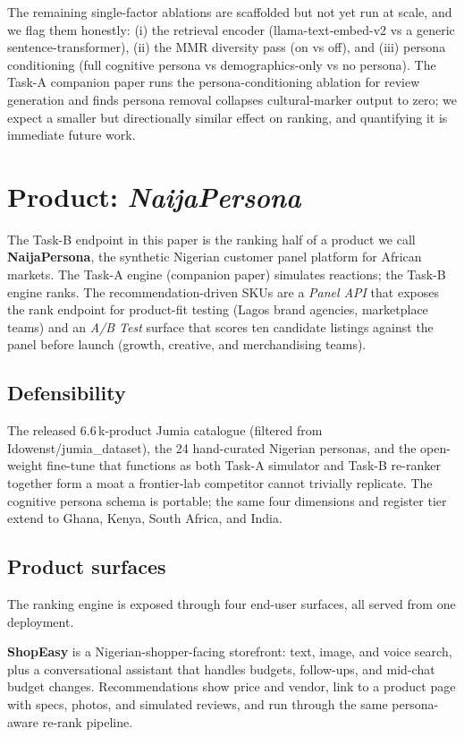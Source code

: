 \documentclass[sigconf,nonacm,balance]{acmart}
\begin{document}
The remaining single-factor ablations are scaffolded but not yet run at
scale, and we flag them honestly: (i) the retrieval encoder
(\textsf{llama-text-embed-v2} vs a generic sentence-transformer),
(ii) the MMR diversity pass (on vs off), and
(iii) persona conditioning (full cognitive persona vs demographics-only vs no
persona). The Task-A companion paper runs the persona-conditioning ablation
for review generation and finds persona removal collapses cultural-marker
output to zero; we expect a smaller but directionally similar effect on
ranking, and quantifying it is immediate future work.

\section{ Product: \emph{NaijaPersona}}
\label{sec:product}

The Task-B endpoint in this paper is the ranking half of a product we
call \textbf{NaijaPersona}, the synthetic Nigerian customer panel platform
for African markets. The Task-A engine (companion paper) simulates
reactions; the Task-B engine ranks. The recommendation-driven SKUs are a
\emph{Panel API} that exposes the rank endpoint for product-fit testing
(Lagos brand agencies, marketplace teams) and an \emph{A/B Test} surface
that scores ten candidate listings against the panel before launch
(growth, creative, and merchandising teams).

\subsection*{Defensibility} The released 6.6\,k-product Jumia catalogue
(filtered from \textsf{Idowenst/jumia\_dataset}), the 24 hand-curated
Nigerian personas, and the open-weight fine-tune that functions as both
Task-A simulator and Task-B re-ranker together form a moat a frontier-lab
competitor cannot trivially replicate. The cognitive persona schema is
portable; the same four dimensions and register tier extend to Ghana,
Kenya, South Africa, and India.

\subsection*{Product surfaces}
The ranking engine is exposed through four end-user surfaces, all served
from one deployment.

\textbf{ShopEasy} is a Nigerian-shopper-facing storefront: text, image, and
voice search, plus a conversational assistant that handles budgets,
follow-ups, and mid-chat budget changes. Recommendations show price and
vendor, link to a product page with specs, photos, and simulated reviews,
and run through the same persona-aware re-rank pipeline.
\end{document}
